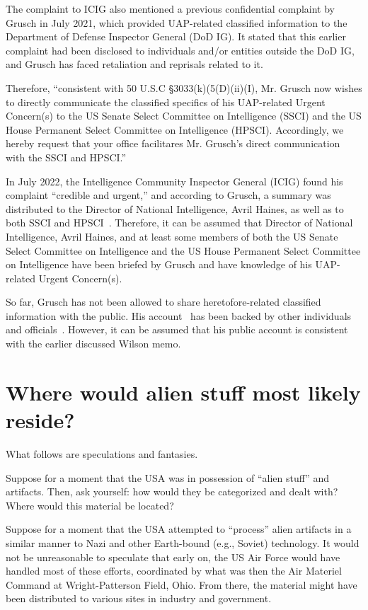 The complaint to ICIG also mentioned a previous confidential complaint by Grusch in July 2021,
which provided UAP-related classified information to the Department of Defense Inspector General (DoD IG).
It stated that this earlier complaint had been disclosed to individuals and/or entities outside the DoD IG,
and Grusch has faced retaliation and reprisals related to it.


Therefore, ``consistent with 50 U.S.C \S 3033(k)(5(D)(ii)(I), Mr. Grusch now wishes to directly communicate
the classified specifics of his UAP-related Urgent Concern(s) to the
US Senate Select Committee on Intelligence (SSCI)
and the
US House Permanent Select Committee on Intelligence (HPSCI).
Accordingly, we hereby request that your office facilitares Mr. Grusch's direct communication with the SSCI and HPSCI.''

In July 2022, the Intelligence Community Inspector General (ICIG) found his complaint ``credible and urgent,''
and according to Grusch, a summary was distributed to the Director of National Intelligence, Avril Haines,
as well as to both SSCI and HPSCI~\cite{Kean2023Jun}.
Therefore, it can be assumed that Director of National Intelligence, Avril Haines,
and at least some members of both the US Senate Select Committee on Intelligence
and the US House Permanent Select Committee on Intelligence have been briefed by Grusch and have knowledge
of his UAP-related Urgent Concern(s).

So far, Grusch has not been allowed to share heretofore-related classified information with the public.
His account~\cite{Grush_2023_OS_HOC} has been backed by other individuals and officials~\cite{Kean2023Jun,Shellenberger2023Jun}.
However, it can be assumed that his public account is consistent with the earlier discussed Wilson memo.



\section{Where would alien stuff most likely reside?}
\label{2023-UFO-part-Perception-crash-retreivals-where}


What follows are speculations and fantasies.

Suppose for a moment that the USA was in possession of ``alien stuff'' and artifacts. Then, ask yourself: how would they be categorized and dealt with? Where would this material be located?

Suppose for a moment that the USA attempted to ``process'' alien artifacts in a similar manner to Nazi and other Earth-bound (e.g., Soviet) technology. It would not be unreasonable to speculate that early on, the US Air Force would have handled most of these efforts, coordinated by what was then the Air Materiel Command at Wright-Patterson Field, Ohio. From there, the material might have been distributed to various sites in industry and government.

